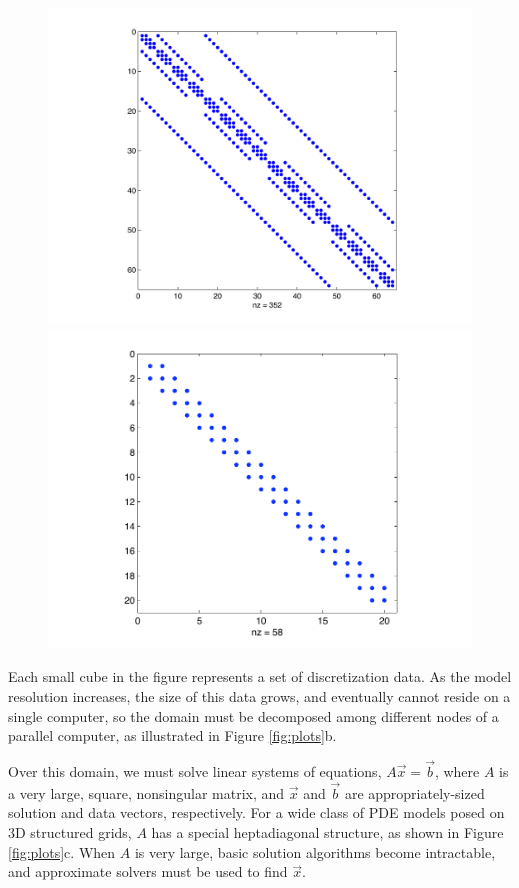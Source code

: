 \documentclass[final]{siamltex}
\renewcommand{\(}{\left(}
\renewcommand{\)}{\right)}
\begin{document}
\begin{figure}[t]
\begin{minipage}[r]{0.6 \textwidth}
\includegraphics[scale=0.34]{heptadiag}
\hspace{0.5cm}
\includegraphics[scale=0.43]{tridiag}
\end{minipage}
\end{figure}
Each small cube in the figure represents a set of discretization data.  As
the model resolution increases, the size of this data grows, and
eventually cannot reside on a single computer, so the domain must be 
decomposed among different nodes of a parallel computer, as
illustrated in Figure \ref{fig:plots}b. 

Over this domain, we must solve linear systems of equations,
$A\vec{x}=\vec{b}$, where $A$ is a very large, square, nonsingular
matrix, and $\vec{x}$ and $\vec{b}$ are appropriately-sized solution
and data vectors, respectively.  For a wide class of PDE models posed
on 3D structured grids, $A$ has a special heptadiagonal structure, as
shown in Figure \ref{fig:plots}c.  When $A$ is very large, basic
solution algorithms become intractable, and approximate solvers must be
used to find $\vec{x}$. 
\end{document}
